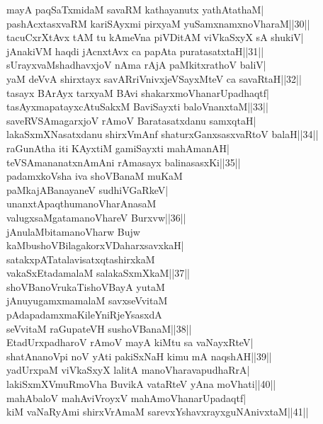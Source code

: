 \documentclass{article}
\begin{document}
mayA paqSaTxmidaM savaRM kathayanutx yathAtathaM|\\
pashAcxtasxvaRM kariSAyxmi pirxyaM yuSamxnamxnoVharaM||30||\\
tacuCxrXtAvx tAM tu kAmeVna piVDitAM viVkaSxyX sA shukiV|\\
jAnakiVM haqdi jAcnxtAvx ca papAta puratasatxtaH||31||\\
sUrayxvaMshadhavxjoV nAma rAjA paMkitxrathoV baliV|\\
yaM deVvA shirxtayx savARriVnivxjeVSayxMteV ca savaRtaH||32||\\
tasayx BArAyx tarxyaM BAvi shakarxmoVhanarUpadhaqtf|\\
tasAyxmapatayxcAtuSakxM BaviSayxti baloVnanxtaM||33||\\
saveRVSAmagarxjoV rAmoV Baratasatxdanu samxqtaH|\\
lakaSxmXNasatxdanu shirxVmAnf shaturxGanxsasxvaRtoV balaH||34||\\
raGunAtha iti KAyxtiM gamiSayxti mahAmanAH|\\
teVSAmananatxnAmAni rAmasayx balinasasxKi||35||\\
padamxkoVsha iva shoVBanaM muKaM\\
paMkajABanayaneV sudhiVGaRkeV|\\
unanxtApaqthumanoVharAnasaM\\
valugxsaMgatamanoVhareV Burxvw||36||\\
jAnulaMbitamanoVharw Bujw\\
kaMbushoVBilagakorxVDaharxsavxkaH|\\
satakxpATatalavisatxqtashirxkaM\\
vakaSxEtadamalaM salakaSxmXkaM||37||\\
shoVBanoVrukaTishoVBayA yutaM\\
jAnuyugamxmamalaM savxseVvitaM\\
pAdapadamxmaKileYniRjeYsasxdA\\
seVvitaM raGupateVH sushoVBanaM||38||\\
EtadUrxpadharoV rAmoV mayA kiMtu sa vaNayxRteV|\\
shatAnanoVpi noV yAti pakiSxNaH kimu mA naqshAH||39||\\
yadUrxpaM viVkaSxyX lalitA manoVharavapudhaRrA|\\
lakiSxmXVmuRmoVha BuvikA vataRteV yAna moVhati||40||\\
mahAbaloV mahAviVroyxV mahAmoVhanarUpadaqtf|\\
kiM vaNaRyAmi shirxVrAmaM sarevxYshavxrayxguNAnivxtaM||41||\\
\end{document}

